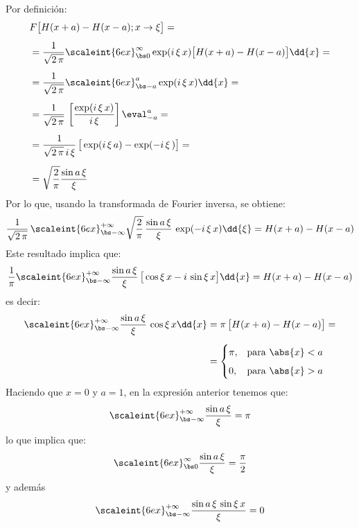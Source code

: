 Por definición:
\begin{align*}
&F \big[ H(x + a) - H(x - a); x \to \xi \big] = \\[0.5em]
&= \dfrac{1}{\sqrt{2\, \pi}} \scaleint{6ex}_{\bs 0}^{\infty} \exp(i \, \xi \, x) \big[ H(x + a) - H(x - a) \big] \dd{x} = \\[0.5em]
&= \dfrac{1}{\sqrt{2\, \pi}} \scaleint{6ex}_{\bs -a}^{a} \exp(i \, \xi \, x) \dd{x} = \\[0.5em]
&= \dfrac{1}{\sqrt{2\, \pi}} \, \left[ \dfrac{\exp(i \, \xi \, x)}{i \, \xi} \right] \eval_{-a}^{a} = \\[0.5em]
&= \dfrac{1}{\sqrt{2\, \pi} \, i \, \xi} \, \big[ \exp(i \, \xi \, a) - \exp(-i \, \xi \, ) \big] = \\[0.5em]
&= \sqrt{\dfrac{2}{\pi}} \dfrac{\sin a \, \xi}{\xi}
\end{align*}
Por lo que, usando la transformada de Fourier inversa, se obtiene:
\begin{align*}
\dfrac{1}{\sqrt{2 \, \pi}} \, \scaleint{6ex}_{\bs -\infty}^{+\infty} \sqrt{\dfrac{2}{\pi}} \, \dfrac{\sin a \, \xi}{\xi} \,  \exp(- i \, \xi \, x) \dd{\xi}  = H(x + a) - H(x- a)
\end{align*}
Este resultado implica que:
\begin{align*}
\dfrac{1}{\pi} \scaleint{6ex}_{\bs -\infty}^{+\infty} \dfrac{\sin a \, \xi}{\xi} \, \big[ \cos \xi \, x - i \, \sin \xi \, x \big] \dd{x} = H(x + a) - H(x - a)
\end{align*}
es decir:
\begin{align*}
\scaleint{6ex}_{\bs -\infty}^{+\infty} \dfrac{\sin a \, \xi}{\xi} \, \cos \xi \, x \dd{x} &= \pi \, \big[ H(x + a) - H(x - a) \big]  = \\[0.5em]
&= \begin{cases}
\pi, & \mbox{para  } \abs{x} < a \\[0.5em]
0, & \mbox{para  } \abs{x} > a
\end{cases}
\end{align*}
Haciendo que $x = 0$ y $a = 1$, en la expresión anterior tenemos que:
\begin{align*}
\scaleint{6ex}_{\bs -\infty}^{+\infty} \dfrac{\sin a \, \xi}{\xi} = \pi
\end{align*}
lo que implica que:
\begin{align*}
\scaleint{6ex}_{\bs 0}^{\infty} \dfrac{\sin a \, \xi}{\xi} = \dfrac{\pi}{2}
\end{align*}
y además
\begin{align*}
\scaleint{6ex}_{\bs -\infty}^{+\infty} \dfrac{\sin a \, \xi \, \sin \xi \, x}{\xi} = 0
\end{align*}

